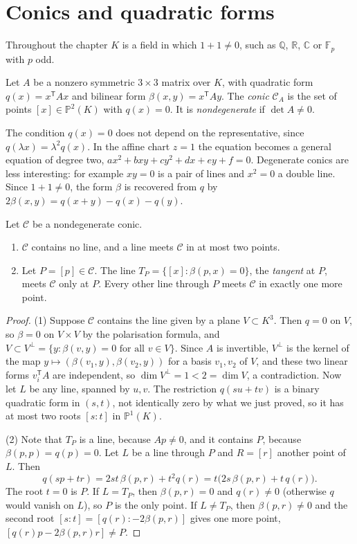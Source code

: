 \section{Conics and quadratic forms}

Throughout the chapter $K$ is a field in which $1+1\ne0$, such as $\mathbb Q$, $\mathbb R$, $\mathbb C$ or $\mathbb F_p$ with $p$ odd.

\begin{definition}\label{def:conic}
Let $A$ be a nonzero symmetric $3\times3$ matrix over $K$, with quadratic form $q(x)=x^{\mathsf T}Ax$ and bilinear form $\beta(x,y)=x^{\mathsf T}Ay$.
The \emph{conic} $\mathcal C_A$ is the set of points $[x]\in\mathbb P^2(K)$ with $q(x)=0$. It is \emph{nondegenerate} if $\det A\ne0$.
\end{definition}

The condition $q(x)=0$ does not depend on the representative, since $q(\lambda x)=\lambda^2q(x)$. In the affine chart $z=1$ the equation becomes a
general equation of degree two, $ax^2+bxy+cy^2+dx+ey+f=0$. Degenerate conics are less interesting: for example $xy=0$ is a pair of lines and $x^2=0$ a
double line. Since $1+1\ne0$, the form $\beta$ is recovered from $q$ by $2\beta(x,y)=q(x+y)-q(x)-q(y)$.

\begin{proposition}\label{prop:conicline}
Let $\mathcal C$ be a nondegenerate conic.
\begin{enumerate}
\item $\mathcal C$ contains no line, and a line meets $\mathcal C$ in at most two points.
\item Let $P=[p]\in\mathcal C$. The line $T_P=\{[x]:\beta(p,x)=0\}$, the \emph{tangent} at $P$, meets $\mathcal C$ only at $P$. Every other line through
$P$ meets $\mathcal C$ in exactly one more point.
\end{enumerate}
\end{proposition}

\begin{proof}
(1) Suppose $\mathcal C$ contains the line given by a plane $V\subset K^3$. Then $q=0$ on $V$, so $\beta=0$ on $V\times V$ by the polarisation
formula, and $V\subset V^\perp=\{y:\beta(v,y)=0\text{ for all }v\in V\}$. Since $A$ is invertible, $V^\perp$ is the kernel of the map
$y\mapsto(\beta(v_1,y),\beta(v_2,y))$ for a basis $v_1,v_2$ of $V$, and these two linear forms $v_i^{\mathsf T}A$ are independent, so
$\dim V^\perp=1<2=\dim V$, a contradiction. Now let $L$ be any line, spanned by $u,v$. The restriction $q(su+tv)$ is a binary quadratic form in
$(s,t)$, not identically zero by what we just proved, so it has at most two roots $[s:t]$ in $\mathbb P^1(K)$.

(2) Note that $T_P$ is a line, because $Ap\ne0$, and it contains $P$, because $\beta(p,p)=q(p)=0$. Let $L$ be a line through $P$ and $R=[r]$ another
point of $L$. Then
\[
q(sp+tr)=2st\,\beta(p,r)+t^2q(r)=t\bigl(2s\,\beta(p,r)+t\,q(r)\bigr).
\]
The root $t=0$ is $P$. If $L=T_P$, then $\beta(p,r)=0$ and $q(r)\ne0$ (otherwise $q$ would vanish on $L$), so $P$ is the only point. If $L\ne T_P$,
then $\beta(p,r)\ne0$ and the second root $[s:t]=[q(r):-2\beta(p,r)]$ gives one more point, $[q(r)p-2\beta(p,r)r]\ne P$.
\end{proof}

